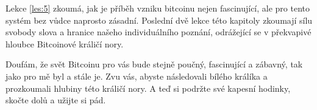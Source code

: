 Lekce \ref{les:5} zkoumá, jak je příběh vzniku bitcoinu nejen fascinující, 
ale pro tento systém bez vůdce naprosto zásadní. Poslední dvě lekce této 
kapitoly zkoumají sílu svobody slova a hranice našeho individuálního poznání, 
odrážející se v překvapivé hloubce Bitcoinové králičí nory.

Doufám, že svět Bitcoinu pro vás bude stejně poučný, fascinující a zábavný, 
tak jako pro mě byl a stále je. Zvu vás, abyste následovali bílého králíka 
a prozkoumali hlubiny této králičí nory. A teď si podržte své kapesní hodinky, 
skočte dolů a užijte si pád.
